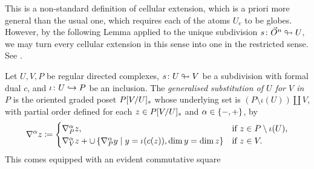 \begin{comm}  \label{comm:def_cellular_extension}
    This is a non-standard definition of cellular extension, which is a priori more general than the usual one, which requires each of the atoms \( U_e \) to be globes.
    However, by the following Lemma applied to the unique subdivision \( s \colon \vec{O}^{n} \looparrowright U \), we may turn every cellular extension in this sense into one in the restricted sense. 
    See \cite[Comment 8.2.2]{hadzihasanovic2024combinatorics}. 
\end{comm}

\begin{dfn} 
    Let \( U, V, P \) be regular directed complexes, \( s \colon U \looparrowright V \) be a subdivision with formal dual \( c \), and \( \iota \colon U \hookrightarrow P \) be an inclusion.
    The \emph{generalised substitution of \( U \) for \( V \) in \( P \)} is the oriented graded poset \( P[V/U]_s \) whose underlying set is \( (P \setminus \iota(U)) \coprod V \), with partial order defined for each \( z \in P[V/U]_s  \) and \( \alpha \in \left\{ {-, +} \right\} \), by
    \begin{equation*}
        \nabla_{}^{\alpha} z \coloneqq 
        \begin{cases}
            \nabla_{P}^{\alpha} z, & \text{if } z \in P \setminus \iota(U), \\
            \nabla_{V}^{\alpha} z + \cup \left\{ {\nabla_{P}^{\alpha} y \mid y = \iota(c(z)), \dim y = \dim z} \right\} & \text{if } z \in V.
        \end{cases}
    \end{equation*}
    This comes equipped with an evident commutative square
\end{dfn}

